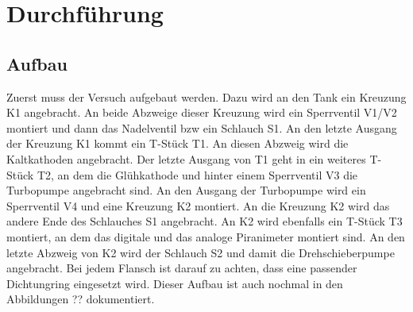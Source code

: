 \section{Durchführung}
\label{sec:Durchführung}
\subsection{Aufbau}
Zuerst muss der Versuch aufgebaut werden. Dazu wird an den Tank ein Kreuzung K1 angebracht. An beide Abzweige dieser Kreuzung wird ein Sperrventil V1/V2
montiert und dann das Nadelventil bzw ein Schlauch S1. An den letzte Ausgang der Kreuzung K1 kommt ein T-Stück T1. An diesen Abzweig wird die Kaltkathoden
angebracht. Der letzte Ausgang von T1 geht in ein weiteres T-Stück T2, an dem die Glühkathode und hinter einem Sperrventil V3 die Turbopumpe angebracht sind.
An den Ausgang der Turbopumpe wird ein Sperrventil V4 und eine Kreuzung K2 montiert. An die Kreuzung K2 wird das andere Ende des Schlauches S1 angebracht. An K2
wird ebenfalls ein T-Stück T3 montiert, an dem das digitale und das analoge Piranimeter montiert sind. An den letzte Abzweig von K2 wird der Schlauch S2 und
damit die Drehschieberpumpe angebracht. Bei jedem Flansch ist darauf zu achten, dass eine passender Dichtungring eingesetzt wird. Dieser Aufbau ist auch
nochmal in den Abbildungen ?? dokumentiert.
